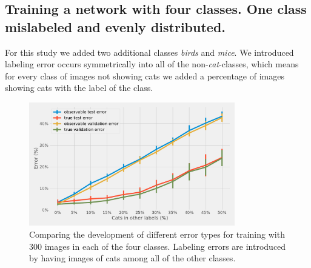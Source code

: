 \documentclass[a4paper,11pt]{scrartcl}
\theoremstyle{definition}
\begin{document}
\subsection[Four labels, one class evenly distributed in all others]{Training a network with four classes. One class mislabeled and evenly distributed.}
For this study we added two additional classes \emph{birds} and \emph{mice}.
We introduced labeling error occurs symmetrically into all of the non-\emph{cat}-classes, which means for every class of images not showing cats we added a percentage of images showing cats with the label of the class.

\begin{figure}%
\centering
\includegraphics[width=0.8\textwidth]{Plots_3/3_Full_comparison_symmetric_mislabel_4_classes.pdf}
\caption[Development of the error rates]{Comparing the development of different error types for training with 300 images in each of the four classes. Labeling errors are introduced by having images of cats among all of the other classes.}
\label{fig:four_classes_full_comparison}
\end{figure}
\end{document}
